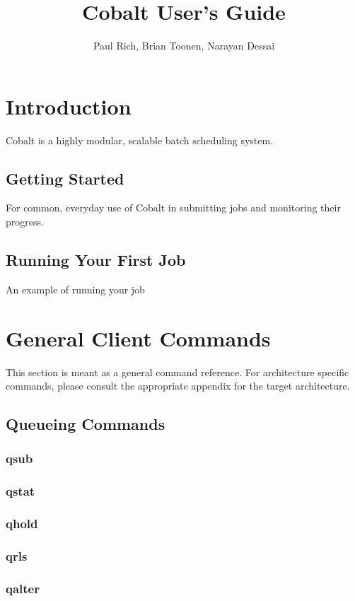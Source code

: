 \documentclass[10pt,letterpaper]{book}
\begin{document}
\title {\textbf{Cobalt User's Guide}}
\author{Paul Rich, Brian Toonen, Narayan Dessai}

\maketitle
\tableofcontents
\chapter{Introduction}
Cobalt is a highly modular, scalable batch scheduling system.  
\section{Getting Started}
For common, everyday use of Cobalt in submitting jobs and monitoring their progress.
\section{Running Your First Job}
An example of running your job

\chapter{General Client Commands}
This section is meant as a general command reference.  For architecture specific commands, please consult the appropriate appendix for the target architecture.

\section{Queueing Commands}
\subsection{qsub}
\subsection{qstat}
\subsection{qhold}
\subsection{qrls}
\subsection{qalter}
\end{document}
